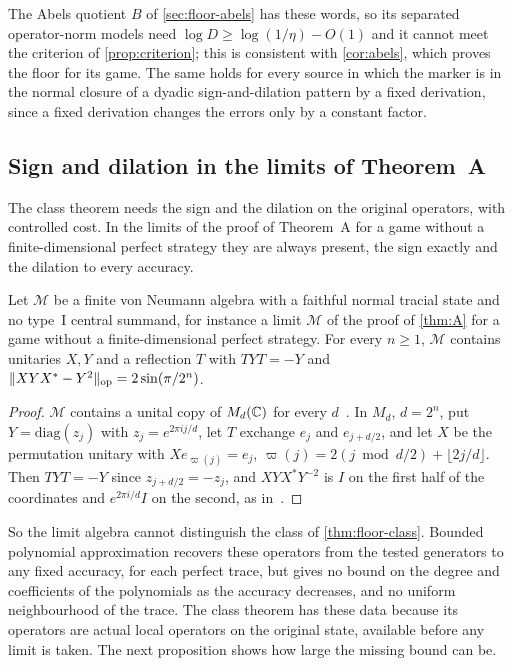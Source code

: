 The Abels quotient $B$ of \cref{sec:floor-abels} has these words, so its separated operator-norm models need $\log D\ge\log(1/\eta)-O(1)$
and it cannot meet the criterion of \cref{prop:criterion}; this is consistent with \cref{cor:abels}, which proves the floor for its
game. The same holds for every source in which the marker is in the normal closure of a dyadic sign-and-dilation pattern by a
fixed derivation, since a fixed derivation changes the errors only by a constant factor.

\subsection{Sign and dilation in the limits of Theorem~A}\label{app:floor-typeII}

The class theorem needs the sign and the dilation on the original operators, with controlled cost. In the limits of the proof of
Theorem~A for a game without a finite-dimensional perfect strategy they are always present, the sign exactly and the dilation to
every accuracy.

\begin{proposition}\label{prop:typeII}
Let $\mathcal M$ be a finite von Neumann algebra with a faithful normal tracial state and no type~I central summand, for instance a
limit $\mathcal M$ of the proof of \cref{thm:A} for a game without a finite-dimensional perfect strategy. For every $n\ge1$,
$\mathcal M$ contains unitaries $X,Y$ and a reflection $T$ with
$TYT=-Y$ and $\lVert XYX^*-Y^2\rVert_{\mathrm{op}}=2\sin(\pi/2^n)$.
\end{proposition}

\begin{proof}
$\mathcal M$ contains a unital copy of $M_d(\mathbb C)$ for every $d$~\cite[Lemma~1.4]{CETW22}. In $M_d$, $d=2^n$, put $Y=\mathrm{diag}(z_j)$
with $z_j=e^{2\pi ij/d}$, let $T$ exchange $e_j$ and $e_{j+d/2}$, and let $X$ be the permutation unitary with $Xe_{\varpi(j)}=e_j$,
$\varpi(j)=2(j\bmod d/2)+\lfloor 2j/d\rfloor$. Then $TYT=-Y$ since $z_{j+d/2}=-z_j$, and $XYX^*Y^{-2}$ is $I$ on the first half of the
coordinates and $e^{2\pi i/d}I$ on the second, as in~\cite[Example~11.11]{DM-game}.
\end{proof}

So the limit algebra cannot distinguish the class of \cref{thm:floor-class}. Bounded polynomial approximation recovers these
operators from the tested generators to any fixed accuracy, for
each perfect trace, but gives no bound on the degree and coefficients of the polynomials as the accuracy decreases, and no uniform
neighbourhood of the trace. The class theorem has these data because its operators are actual local operators on the original
state, available before any limit is taken. The next proposition shows how large the missing bound can be.


